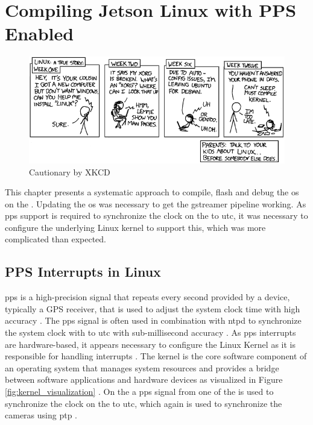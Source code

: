 

\chapter{Compiling Jetson Linux with PPS Enabled}
\label{chap:flashing_xavier}
\begin{figure}[H]
    \centering
    \includegraphics[width=\textwidth]{figures/cautionary.png}
    \caption{Cautionary by XKCD \cite{xkcdCautionary2008}}
    \label{fig:xkcd_cautionary}
\end{figure}
This chapter presents a systematic approach to compile, flash and debug the \gls{os} on the \jx.
Updating the \gls{os} was necessary to get the \gls{gstreamer} pipeline working.
As \gls{pps} support is required to synchronize the clock on the \jx to \gls{utc}, it was necessary to configure the underlying Linux kernel to support this, which was more complicated than expected.


\section{PPS Interrupts in Linux}
\gls{pps} is a high-precision signal that repeats every second provided by a device, typically a GPS receiver, that is used to adjust the system clock time with high accuracy \cite{giomettiLinuxPPSWikiLinuxPPS2007}.
The \gls{pps} signal is often used in combination with \gls{ntpd} to synchronize the system clock with to \gls{utc} with sub-millisecond accuracy \cite{giomettiLinuxPPSWikiLinuxPPS2007}.
As \gls{pps} interrupts are hardware-based, it appears necessary to configure the Linux Kernel as it is responsible for handling interrupts \cite{giomettiLinuxPPSWikiLinuxPPS2007}.
The kernel is the core software component of an operating system that manages system resources and provides a bridge between software applications and hardware devices as visualized in Figure \ref{fig:kernel_visualization} \cite{thekerneldevelopmentcommunityInterruptsLinuxKernel}.
On the \sr a \gls{pps} signal from one of the  is used to synchronize the clock on the \jx to \gls{utc}, which again is used to synchronize the cameras using \gls{ptp} \cite{martensPortableSensorRig2022}.

